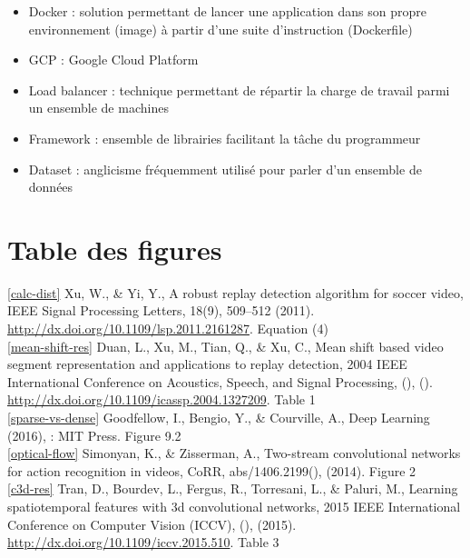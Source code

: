 \documentclass[11pt]{article}
\begin{document}
\begin{itemize}
\item Docker : solution permettant de lancer une application dans son propre environnement (image) à partir d'une suite d'instruction (Dockerfile)\\
\item GCP : Google Cloud Platform\\
\item Load balancer : technique permettant de répartir la charge de travail parmi un ensemble de machines\\
\item Framework : ensemble de librairies facilitant la tâche du programmeur\\
\item Dataset : anglicisme fréquemment utilisé pour parler d'un ensemble de données\\
\end{itemize}

\newpage
\section{Table des figures}
\label{sec:orgc72f010}
\ref{calc-dist} Xu, W., \& Yi, Y., A robust replay detection algorithm for soccer video, IEEE Signal Processing Letters, 18(9), 509–512 (2011).  \url{http://dx.doi.org/10.1109/lsp.2011.2161287}. Equation (4)\\

\ref{mean-shift-res} Duan, L., Xu, M., Tian, Q., \& Xu, C., Mean shift based video segment representation and applications to replay detection, 2004 IEEE International Conference on Acoustics, Speech, and Signal Processing, (),  ().  \url{http://dx.doi.org/10.1109/icassp.2004.1327209}. Table 1\\

\ref{sparse-vs-dense} Goodfellow, I., Bengio, Y., \& Courville, A., Deep Learning (2016), : MIT Press. \cite{Goodfellow-et-al-2016} Figure 9.2\\

\ref{optical-flow} Simonyan, K., \& Zisserman, A., Two-stream convolutional networks for action recognition in videos, CoRR, abs/1406.2199(),  (2014). Figure 2\\

\ref{c3d-res} Tran, D., Bourdev, L., Fergus, R., Torresani, L., \& Paluri, M., Learning spatiotemporal features with 3d convolutional networks, 2015 IEEE International Conference on Computer Vision (ICCV), (),  (2015).  \url{http://dx.doi.org/10.1109/iccv.2015.510}. Table 3\\
\end{document}
